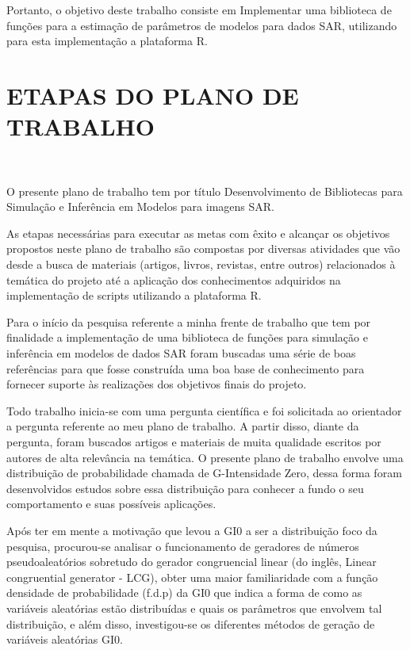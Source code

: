 \documentclass[12pt,letterpaper]{article}
\begin{document}
Portanto, o objetivo deste trabalho consiste em Implementar uma biblioteca de
funções para a estimação de parâmetros de modelos para dados SAR, utilizando para esta implementação a plataforma R. 



\newpage
\section*{\centering \textbf{ETAPAS DO PLANO DE TRABALHO}}
\hrulefill \\

\vspace{0.5cm}

O presente plano de trabalho tem por título Desenvolvimento de Bibliotecas para Simulação e Inferência em Modelos para imagens SAR.

As etapas necessárias para executar as metas com êxito e alcançar os objetivos propostos neste plano de trabalho são compostas por diversas atividades que vão desde a busca de materiais (artigos, livros, revistas, entre outros) relacionados à temática do projeto até a aplicação dos conhecimentos adquiridos na implementação de scripts utilizando a plataforma R. 

Para o início da pesquisa referente a minha frente de trabalho que tem por finalidade a implementação de uma biblioteca de funções para simulação e inferência em modelos de dados SAR foram buscadas uma série de boas referências para que fosse construída uma boa base de conhecimento para fornecer suporte às realizações dos objetivos finais do projeto.

Todo trabalho inicia-se com uma pergunta científica e foi solicitada ao orientador a pergunta referente ao meu plano de trabalho. A partir disso, diante da pergunta, foram buscados artigos e materiais de muita qualidade escritos por autores de alta relevância na temática.
O presente plano de trabalho envolve uma distribuição de probabilidade chamada de G-Intensidade Zero, dessa forma foram desenvolvidos estudos sobre essa distribuição para conhecer a fundo o seu comportamento e suas possíveis aplicações.

Após ter em mente a motivação que levou a GI0 a ser a distribuição foco da pesquisa, procurou-se analisar o funcionamento de geradores de números pseudoaleatórios sobretudo do gerador congruencial linear (do inglês, Linear congruential generator - LCG), obter uma maior familiaridade com a função densidade de probabilidade (f.d.p) da GI0 que indica a forma de como as variáveis aleatórias estão distribuídas e quais os parâmetros que envolvem tal distribuição, e além disso, investigou-se os diferentes métodos de geração de variáveis aleatórias GI0.
\end{document}
